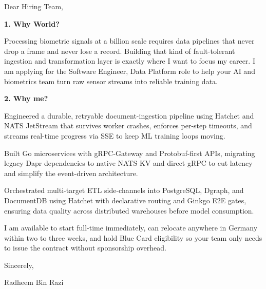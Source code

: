 \documentclass[11pt,a4paper]{coverletter}
\begin{document}

\opening{Dear Hiring Team,}

\vspace{8pt}\noindent\textbf{1. Why World?}\par\vspace{3pt}

Processing biometric signals at a billion scale requires data pipelines that never drop a frame and never lose a record. Building that kind of fault-tolerant ingestion and transformation layer is exactly where I want to focus my career. I am applying for the Software Engineer, Data Platform role to help your AI and biometrics team turn raw sensor streams into reliable training data.

\vspace{8pt}\noindent\textbf{2. Why me?}\par\vspace{3pt}

\bullets

  \item Engineered a durable, retryable document-ingestion pipeline using Hatchet and NATS JetStream that survives worker crashes, enforces per-step timeouts, and streams real-time progress via SSE to keep ML training loops moving.

  \item Built Go microservices with gRPC-Gateway and Protobuf-first APIs, migrating legacy Dapr dependencies to native NATS KV and direct gRPC to cut latency and simplify the event-driven architecture.

  \item Orchestrated multi-target ETL side-channels into PostgreSQL, Dgraph, and DocumentDB using Hatchet with declarative routing and Ginkgo E2E gates, ensuring data quality across distributed warehouses before model consumption.

\bulletsend

I am available to start full-time immediately, can relocate anywhere in Germany within two to three weeks, and hold Blue Card eligibility so your team only needs to issue the contract without sponsorship overhead.

\closing{Sincerely,}{Radheem Bin Razi}

\clearpage
{}

\end{document}
